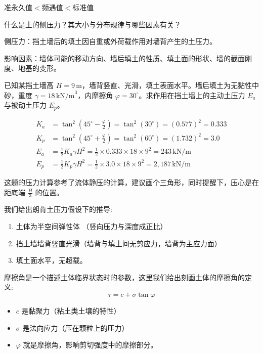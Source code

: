 \documentclass[12pt, a4paper, oneside, UTF8]{ctexbook}
\begin{document}
\begin{definition}
    准永久值$<$频遇值$<$标准值
\end{definition}

\begin{example}
    什么是土的侧压力？其大小与分布规律与哪些因素有关？

侧压力：挡土墙后的填土因自重或外荷载作用对墙背产生的土压力。

影响因素：墙体可能的移动方向、墙后填土的性质、填土面的形状、墙的截面刚度、地基的变形。
\end{example}

\begin{example}
    已知某挡土墙高 \( H = 9\,\mathrm{m} \)，墙背竖直、光滑，填土表面水平。墙后填土为无黏性中砂，重度 \( \gamma = 18\,\mathrm{kN/m}^3 \)，内摩擦角 \( \varphi = 30^\circ \)。求作用在挡土墙上的主动土压力 \( E_a \) 与被动土压力 \( E_p \)。

    \begin{align*}
        K_a &= \tan^2\left(45^\circ - \frac{\varphi}{2}\right) = \tan^2(30^\circ) = (0.577)^2 = 0.333 \\
        K_p &= \tan^2\left(45^\circ + \frac{\varphi}{2}\right) = \tan^2(60^\circ) = (1.732)^2 = 3.0 \\
        E_a &= \frac{1}{2} K_a \gamma H^2 = \frac{1}{2} \times 0.333 \times 18 \times 9^2 = 243\,\mathrm{kN/m} \\
        E_p &= \frac{1}{2} K_p \gamma H^2 = \frac{1}{2} \times 3.0 \times 18 \times 9^2 = 2,\!187\,\mathrm{kN/m}
    \end{align*}

    这题的压力计算参考了流体静压的计算，建议画个三角形，同时提醒下，压心是在距底端 \(\frac{H}{3}\) 的位置。

    我们给出朗肯土压力假设下的推导:
    \begin{enumerate}
        \item   土体为半空间弹性体 （竖向压力与深度成正比）
        \item 挡土墙墙背竖直光滑（墙背与填土间无剪应力，墙背为主应力面）
        \item 填土面水平，无超载。
    \end{enumerate}

    摩擦角是一个描述土体临界状态时的参数，这里我们给出刻画土体的摩擦角的定义:
\[
\tau = c + \sigma \tan \varphi
\]
\begin{itemize}
    \item \(c\) 是黏聚力（粘土类土壤的特性）
    \item \(\sigma\) 是法向应力（压在颗粒上的压力）
    \item \(\varphi\) 就是摩擦角，影响剪切强度中的摩擦部分。
\end{itemize}


\end{example}
\end{document}
